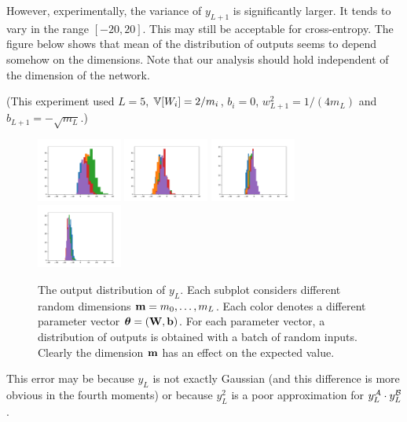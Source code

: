 However, experimentally, the variance of $y_{L+1}$ is significantly larger.
It tends to vary in the range $[-20, 20]$.
This may still be acceptable for cross-entropy.
The figure below shows that mean of the distribution of outputs seems to depend somehow on the dimensions.
Note that our analysis should hold independent of the dimension of the network.

(This experiment used $L = 5$, $\mathbb{V}[W_{i}] = 2 / m_{i}$, $b_{i} = 0$, $w_{L+1}^2 = 1 / (4 m_{L})$ and $b_{L+1} = -\sqrt{m_{L}}$.)

\begin{figure}[H]
\centering
\includegraphics[width=28mm]{code/siamese_hist_L_5_size_1}
\includegraphics[width=28mm]{code/siamese_hist_L_5_size_2}
\includegraphics[width=28mm]{code/siamese_hist_L_5_size_3}
\includegraphics[width=28mm]{code/siamese_hist_L_5_size_4}
\caption{
  The output distribution of $y_{L}$.
  Each subplot considers different random dimensions $\boldsymbol{\mathbf{m}} = m_{0}, \dots, m_{L}$.
  Each color denotes a different parameter vector $\boldsymbol{\mathbf{\theta}} = (\boldsymbol{\mathbf{W}}, \boldsymbol{\mathbf{b}})$.
  For each parameter vector, a distribution of outputs is obtained with a batch of random inputs.
  Clearly the dimension $\boldsymbol{\mathbf{m}}$ has an effect on the expected value.
}
\end{figure}

This error may be because $y_{L}$ is not exactly Gaussian (and this difference is more obvious in the fourth moments) or because $y_{L}^2$ is a poor approximation for $y_{L}^{\mathcal{A}} \cdot y_{L}^{\mathcal{B}}$.

